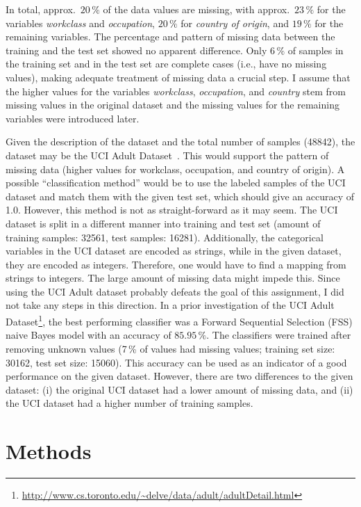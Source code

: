 \documentclass[a4paper,11pt]{article}
\begin{document}
In total, approx.\
$20\,\%$ of the data values are missing, with approx.\
$23\,\%$ for the variables \emph{workclass} and \emph{occupation},
$20\,\%$ for \emph{country of origin}, and
$19\,\%$ for the remaining variables. The percentage and pattern of
missing data between the training and the test set showed no apparent
difference. Only
$6\,\%$ of samples in the training set and in the test set are
complete cases (i.e., have no missing values), making adequate
treatment of missing data a crucial step. I assume that the higher
values for the variables \emph{workclass}, \emph{occupation}, and
\emph{country} stem from missing values in the original dataset and
the missing values for the remaining variables were introduced later.

Given the description of the dataset and the total number of samples
(48842), the dataset may be the UCI Adult
Dataset~\cite{lichman2013}. This would support the pattern of missing
data (higher values for workclass, occupation, and country of
origin). A possible ``classification method'' would be to use the
labeled samples of the UCI dataset and match them with the given test
set, which should give an accuracy of 1.0. However, this method is not
as straight-forward as it may seem. The UCI dataset is split in a
different manner into training and test set (amount of training
samples: 32561, test samples: 16281). Additionally, the categorical
variables in the UCI dataset are encoded as strings, while in the
given dataset, they are encoded as integers. Therefore, one would have
to find a mapping from strings to integers. The large amount of
missing data might impede this. Since using the UCI Adult dataset
probably defeats the goal of this assignment, I did not take any steps
in this direction. In a prior investigation of the UCI Adult
Dataset\footnote{\url{http://www.cs.toronto.edu/~delve/data/adult/adultDetail.html}},
the best performing classifier was a Forward Sequential Selection
(FSS) naive Bayes model with an accuracy of $85.95\,\%$. The
classifiers were trained after removing unknown values (7\,\% of
values had missing values; training set size: 30162, test set size:
15060). This accuracy can be used as an indicator of a good
performance on the given dataset. However, there are two differences
to the given dataset: (i) the original UCI dataset had a lower amount
of missing data, and (ii) the UCI dataset had a higher number of
training samples.

\section{Methods}
\label{sec:methods}
\end{document}

